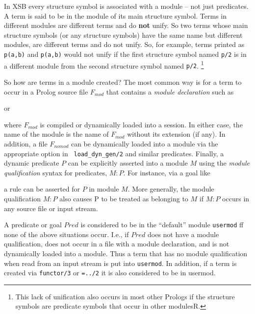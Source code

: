 In XSB every structure symbol is associated with a module -- not just
predicates.  A term is said to be in the module of its main structure
symbol.  Terms in different modules are different terms and do {\bf
  not} unify.  So two terms whose main structure symbols (or any
structure symbols) have the same name but different modules, are
different terms and do not unify.  So, for example, terms printed as
{\tt p(a,b)} and {\tt p(a,b)} would not unify if the first structure
symbol named {\tt p/2} is in a different module from the second
structure symbol named {\tt p/2}. \footnote{This lack of unification
  also occurs in most other Prologs if the structure symbols are
  predicate symbols that occur in other modulesR.}

So how are terms in a module created?  The most common way
is for a term to occur in a Prolog source file $F_{mod}$ that contains
a {\em module declaration} such as


or


\noindent 
where $F_{mod}$ is compiled or dynamically loaded into a session.  In
either case, the name of the module is the name of $F_{mod}$ without
its extension (if any).  In addition, a file $F_{nomod}$ can be
dynamically loaded into a module via the appropriate option in {\tt
  load\_dyn\_gen/2} and similar predicates.  Finally, a dynamic
predicate $P$ can be explicitly asserted into a module $M$ using the
{\em module qualification} syntax for predicates, $M:P$.  For
instance, via a goal like


\noindent
a rule can be asserted for $P$ in module $M$.  More generally, the
module qualification $M:P$ also causes P to be treated as belonging to
$M$ if $M:P$ occurs in any source file or input stream.


A predicate or goal $Pred$ is considered to be in the ``default''
module {\tt usermod} ff none of the above situations occur.  I.e., if
$Pred$ does not have a module qualification, does not occur in a file
with a module declaration, and is not dynamically loaded into a
module.  Thus a term that has no module qualification when read from
an input stream is put into {\tt usermod}.  In addition, if a term is
created via {\tt functor/3} or {\tt =../2} it is also considered to be
in usermod.


